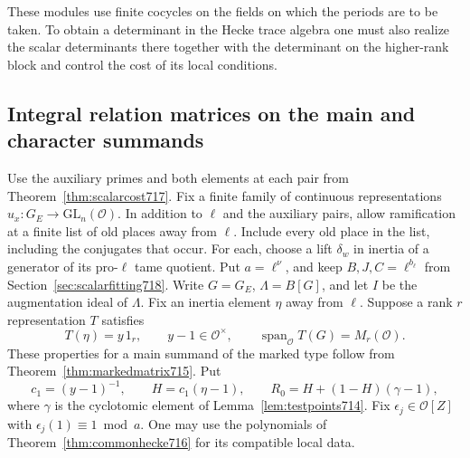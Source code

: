 \documentclass[a4paper,11pt]{article}
\theoremstyle{definition}
\theoremstyle{remark}
\numberwithin{equation}{section}
\begin{document}
These modules use finite cocycles on the fields on which the
periods are to be taken. To obtain a determinant in the Hecke
trace algebra one must also realize the scalar determinants
there together with the determinant on the higher-rank block
and control the cost of its local conditions.
\clearpage


\subsection{Integral relation matrices on the main and character summands}
\label{sec:relationmatrices719}

Use the auxiliary primes and both elements at each pair from
Theorem~\ref{thm:scalarcost717}. Fix a finite family of continuous
representations \(u_x:G_E\to\mathrm{GL}_n(\mathcal O)\).
In addition to \(\ell\) and the auxiliary pairs, allow ramification
at a finite list of old places away from \(\ell\). Include every
old place in the list, including the conjugates that occur.
For each, choose a lift \(\delta_w\) in inertia of a generator of
its pro-\(\ell\) tame quotient. Put \(a=\ell^\nu\), and keep
\(B,J,C=\ell^{b_\ell}\) from Section~\ref{sec:scalarfitting718}.
Write \(G=G_E\), \(\Lambda=B[G]\), and let \(I\) be the augmentation
ideal of \(\Lambda\). Fix an inertia element \(\eta\) away from
\(\ell\). Suppose a rank \(r\) representation \(T\) satisfies
\[
       T(\eta)=y\,1_r,\qquad y-1\in\mathcal O^\times,\qquad
       \operatorname{span}_{\mathcal O}T(G)=M_r(\mathcal O).
\]
These properties for a main summand of the marked type follow
from Theorem~\ref{thm:markedmatrix715}. Put
\[
       c_1=(y-1)^{-1},\qquad H=c_1(\eta-1),\qquad
       R_0=H+(1-H)(\gamma-1),
\]
where \(\gamma\) is the cyclotomic element of
Lemma~\ref{lem:testpoints714}. Fix \(\epsilon_j\in\mathcal O[Z]\)
with \(\epsilon_j(1)\equiv1\bmod a\). One may use the polynomials
of Theorem~\ref{thm:commonhecke716} for its compatible local data.
\end{document}
